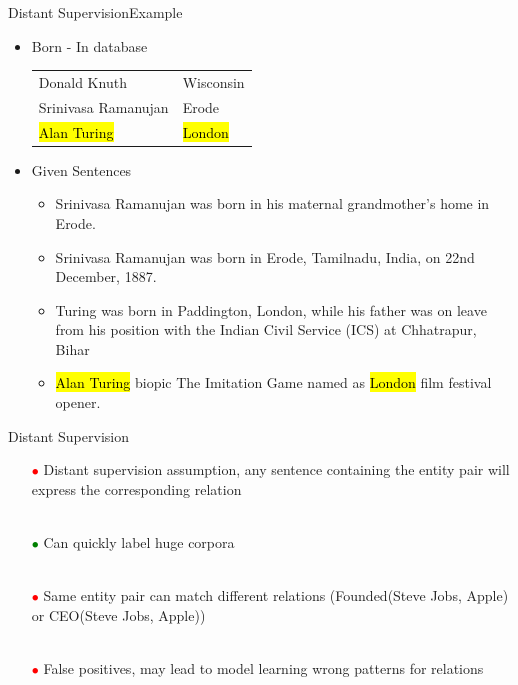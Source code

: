 \documentclass{beamer}
\makeatletter
\newcommand\SoulColor{%
  \let\set@color\beamerorig@set@color
  \let\reset@color\beamerorig@reset@color}
\makeatother
\begin{document}
\begin{frame}{Distant Supervision}{Example}
\begin{itemize}
 
\item Born - In database
 \begin{center}
\begin{tabular}{|l|l|}
\hline
Donald Knuth & Wisconsin \\
Srinivasa Ramanujan & Erode \\
\SoulColor\hl{Alan Turing} & \SoulColor\hl{London} \\
\hline
\end{tabular}
\end{center}
\item Given Sentences
\begin{itemize}
\item Srinivasa Ramanujan was born in his maternal grandmother’s home in Erode.
\item Srinivasa Ramanujan was born in Erode, Tamilnadu, India, on 22nd December, 1887.
\item Turing was born in Paddington, London, while his father was on leave from his position with the Indian Civil Service (ICS) at Chhatrapur, Bihar
\item \alert<+> {\SoulColor\hl{Alan Turing} biopic The Imitation Game named as \SoulColor\hl{London} film festival opener.}
\end{itemize}
\end{itemize}
 
\end{frame}
\begin{frame}{Distant Supervision} \pause
\begin{itemize}
\item[\textcolor{red}{$\bullet$}] Distant supervision assumption, any sentence containing the entity pair will express the corresponding relation \pause \\~\\
\item[\textcolor{green}{$\bullet$}] Can quickly label huge corpora \pause \\~\\
\item[\textcolor{red}{$\bullet$}] Same entity pair can match different relations (Founded(Steve Jobs, Apple) or CEO(Steve Jobs, Apple)) \pause \\~\\
\item[\textcolor{red}{$\bullet$}] False positives, may lead to model learning wrong patterns for relations 
\end{itemize}
\end{frame}
\end{document}
